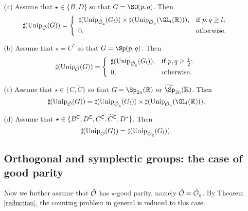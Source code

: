 \documentclass[counting_main.tex]{subfiles}
\begin{document}
\begin{thm}\label{reduction}
(a) Assume that $\star\in \{B,D\}$ so that $G=\SO(p,q)$. Then
 \[
\sharp(\Unip_{\check \CO}(G))=\left\{
     \begin{array}{ll}
      \sharp(\Unip_{\check \CO_{\mathrm g}}(G_l))\times \sharp(\Unip_{\check \CO_{\mathrm b}}(\GL_l(\R)) ), &\hbox{if $p,q\geq l$}; \smallskip\\
           0, &\hbox{otherwise.}  \end{array}
   \right.
        \]

(b) Assume that $\star=C^*$ so that $G=\Sp(p,q)$. Then
 \[
\sharp(\Unip_{\check \CO}(G))=\left\{
     \begin{array}{ll}
      \sharp(\Unip_{\check \CO_{\mathrm g}}(G_l )), &\hbox{if $p,q\geq \frac{l}{2}$}; \smallskip\\
           0, &\hbox{otherwise.}  \end{array}
   \right.
        \]


(c) Assume that $\star\in \{C,\widetilde C\}$ so that $G=\Sp_{2n}(\R)$ or $\widetilde \Sp_{2n}(\R)$. Then
 \[
\sharp(\Unip_{\check \CO}(G))=
      \sharp(\Unip_{\check \CO_{\mathrm g}}(G_l))\times \sharp(\Unip_{\check \CO_{\mathrm b}}(\GL_l(\R)) ).       \]


(d)  Assume that $\star\in \{B^{\mathbb{C}}, D^{\mathbb{C}}, C^{\mathbb{C}},\widetilde C^{\mathbb{C}}, D^*\}$. Then
 \[
\sharp(\mathrm{Unip}_{\check {{\mathcal {O}}}}(G))=
      \sharp(\mathrm{Unip}_{\check {{\mathcal {O}}}_{\mathrm g}}(G_l)).
       \]





\end{thm}


\subsection{Orthogonal and symplectic groups: the case of good parity}
Now we further assume that  $\check {{\mathcal {O}}}$ has $\star$-good parity, namely $\check {{\mathcal {O}}}=\check {{\mathcal {O}}}_{\mathrm g}$. By Theorem \ref{reduction}, the counting problem in general is reduced to this  case.



\end{document}
